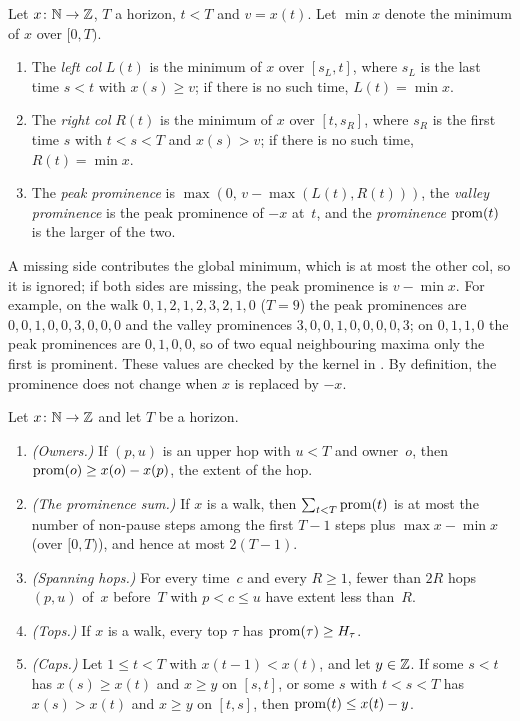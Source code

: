\begin{definition}[Prominence]\label{def:prom}
Let $x\colon\mathbb{N}\to\mathbb{Z}$, $T$ a horizon, $t<T$ and $v=x(t)$. Let $\min x$ denote the minimum of $x$ over $[0,T)$.
\begin{enumerate}[label=(\alph*)]
\item The \emph{left col} $L(t)$ is the minimum of $x$ over $[s_L,t]$, where $s_L$ is the last time $s<t$ with $x(s)\ge v$;
if there is no such time, $L(t)=\min x$.
\item The \emph{right col} $R(t)$ is the minimum of $x$ over $[t,s_R]$, where $s_R$ is the first time $s$ with $t<s<T$ and
$x(s)>v$; if there is no such time, $R(t)=\min x$.
\item The \emph{peak prominence} is $\max(0,\,v-\max(L(t),R(t)))$, the \emph{valley prominence} is the peak prominence of $-x$
at~$t$, and the \emph{prominence} $\operatorname{prom}(t)$ is the larger of the two.
\end{enumerate}
\end{definition}

A missing side contributes the global minimum, which is at most the other col, so it is ignored; if both sides are missing,
the peak prominence is $v-\min x$. For example, on the walk $0,1,2,1,2,3,2,1,0$ ($T=9$) the peak prominences are
$0,0,1,0,0,3,0,0,0$ and the valley prominences $3,0,0,1,0,0,0,0,3$; on $0,1,1,0$ the peak prominences are $0,1,0,0$, so of two
equal neighbouring maxima only the first is prominent. These values are checked by the kernel in .
By definition, the prominence does not change when $x$ is replaced by $-x$.

\begin{proposition}[Prominence]\label{prop:prom}
Let $x\colon\mathbb{N}\to\mathbb{Z}$ and let $T$ be a horizon.
\begin{enumerate}[label=(P\arabic*)]
\item \emph{(Owners.)} If $(p,u)$ is an upper hop with $u<T$ and owner~$o$, then $\operatorname{prom}(o)\ge x(o)-x(p)$, the extent of the
hop.
\item \emph{(The prominence sum.)} If $x$ is a walk, then $\sum_{t<T}\operatorname{prom}(t)$ is at most the number of non-pause steps among
the first $T-1$ steps plus $\max x-\min x$ (over $[0,T)$), and hence at most $2(T-1)$.
\item \emph{(Spanning hops.)} For every time~$c$ and every $R\ge1$, fewer than $2R$ hops $(p,u)$ of~$x$ before~$T$ with
$p<c\le u$ have extent less than~$R$.
\item \emph{(Tops.)} If $x$ is a walk, every top $\tau$ has $\operatorname{prom}(\tau)\ge H_\tau$.
\item \emph{(Caps.)} Let $1\le t<T$ with $x(t-1)<x(t)$, and let $y\in\mathbb{Z}$. If some $s<t$ has $x(s)\ge x(t)$ and $x\ge y$
on $[s,t]$, or some $s$ with $t<s<T$ has $x(s)>x(t)$ and $x\ge y$ on $[t,s]$, then $\operatorname{prom}(t)\le x(t)-y$.
\end{enumerate}
\end{proposition}

